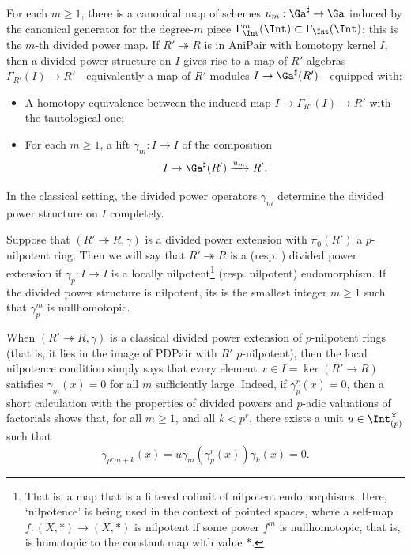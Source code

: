 \documentclass[10pt]{amsart}
\begin{document}
\begin{remark}
\label{rem:divided_powers_div_algebra}
For each $m\ge 1$, there is a canonical map of schemes $u_m:\Ga^\sharp\to \Ga$ induced by the canonical generator for the degree-$m$ piece $\Gamma^m_{\Int}(\Int)\subset \Gamma_{\Int}(\Int)$: this is the $m$-th divided power map. If $R'\twoheadrightarrow R$ is in $\mathrm{AniPair}$ with homotopy kernel $I$, then a divided power structure on $I$ gives rise to a map of $R'$-algebras $\Gamma_{R'}(I)\to R'$---equivalently a map of $R'$-modules $I \to \Ga^\sharp(R')$---equipped with: 
\begin{itemize}
   \item A homotopy equivalence between the induced map $I\to \Gamma_{R'}(I)\to R'$ with the tautological one;
   \item For each $m\ge 1$, a lift $\gamma_m:I\to I$ of the composition
   \[
     I \to \Ga^\sharp(R')\xrightarrow{u_m}R'.
   \]
\end{itemize}
In the classical setting, the divided power operators $\gamma_m$ determine the divided power structure on $I$ completely.
\end{remark}


\begin{definition}
\label{defn:nilpotent_divided_powers}
Suppose that $(R'\twoheadrightarrow R,\gamma)$ is a divided power extension with $\pi_0(R')$ a $p$-nilpotent ring. Then we will say that $R'\twoheadrightarrow R$ is a  (resp. ) divided power extension if $\gamma_p:I\to I$ is a locally nilpotent\footnote{That is, a map that is a filtered colimit of nilpotent endomorphisms. Here, `nilpotence' is being used in the context of pointed spaces, where a self-map $f:(X,*)\to (X,*)$ is nilpotent if some power $f^m$ is nullhomotopic, that is, is homotopic to the constant map with value $*$.} (resp. nilpotent) endomorphism. If the divided power structure is nilpotent, its  is the smallest integer $m\ge 1$ such that $\gamma_p^m$ is nullhomotopic.
\end{definition}


\begin{remark}
\label{rem:nilpotent_divided_powers_classical}
When $(R'\twoheadrightarrow R,\gamma)$ is a classical divided power extension of $p$-nilpotent rings (that is, it lies in the image of $\mathrm{PDPair}$ with $R'$ $p$-nilpotent), then the local nilpotence condition simply says that every element $x\in I = \ker(R'\to R)$ satisfies $\gamma_m(x) = 0$ for all $m$ sufficiently large. Indeed, if $\gamma_p^r(x) = 0$, then a short calculation with the properties of divided powers and $p$-adic valuations of factorials shows that, for all $m\ge 1$, and all $k<p^r$, there exists a unit $u\in \Int_{(p)}^\times$ such that
\[
\gamma_{p^rm+k}(x) = u\gamma_m(\gamma_{p}^r(x))\gamma_k(x) = 0.
\] 
\end{remark} 
\end{document}

